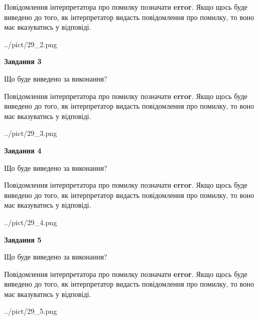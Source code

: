 \documentclass[12pt, ukrainian]{article}
\begin{document}
{\begin {large}
Повідомлення інтерпретатора про помилку позначати \textbf{error}.
Якщо щось буде виведено до того, як інтерпретатор видасть повідомлення про помилку, 
то воно має вказуватись у відповіді. \par


\begin{center}
	{../pict/29_2.png}
\end{center}
\newpage

{\begin {center}\textbf{Завдання 3}\end {center}}\par
Що буде виведено за виконання?

Повідомлення інтерпретатора про помилку позначати \textbf{error}.
Якщо щось буде виведено до того, як інтерпретатор видасть повідомлення про помилку, 
то воно має вказуватись у відповіді. \par


\begin{center}
	{../pict/29_3.png}
\end{center}
\newpage

{\begin {center}\textbf{Завдання 4}\end {center}}\par
Що буде виведено за виконання?

Повідомлення інтерпретатора про помилку позначати \textbf{error}.
Якщо щось буде виведено до того, як інтерпретатор видасть повідомлення про помилку, 
то воно має вказуватись у відповіді. \par


\begin{center}
	{../pict/29_4.png}
\end{center}
\newpage

{\begin {center}\textbf{Завдання 5}\end {center}}\par
Що буде виведено за виконання?

Повідомлення інтерпретатора про помилку позначати \textbf{error}.
Якщо щось буде виведено до того, як інтерпретатор видасть повідомлення про помилку, 
то воно має вказуватись у відповіді. \par


\begin{center}
	{../pict/29_5.png}
\end{center}
\newpage


\end{large}}
\end{document}
